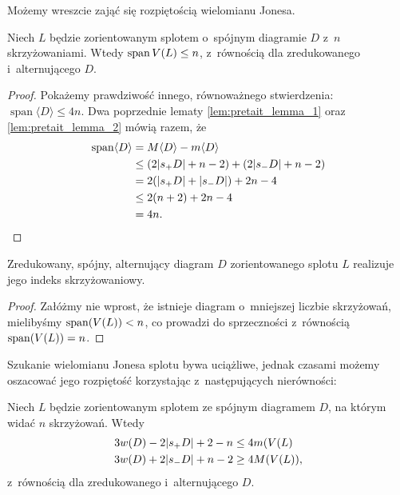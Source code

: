 Możemy wreszcie zająć się rozpiętością wielomianu Jonesa.

\begin{proposition}
    Niech $L$ będzie zorientowanym splotem o~spójnym diagramie $D$ z~$n$ skrzyżowaniami.
    Wtedy $\operatorname{span} V(L) \le n$, z~równością dla zredukowanego i~alternującego $D$.
\end{proposition}

\begin{proof}
    Pokażemy prawdziwość innego, równoważnego stwierdzenia: $\operatorname{span} \langle D\rangle\le 4n$.
    Dwa poprzednie lematy \ref{lem:pretait_lemma_1} oraz \ref{lem:pretait_lemma_2} mówią razem, że
    \begin{align}
        \operatorname{span}\langle D\rangle
        & = M\langle D\rangle - m\langle D\rangle \\
        & \le (2|s_+D|+n-2)+(2|s_-D|+n-2) \\
        & = 2(|s_+D|+|s_- D|)+2n-4 \\
        & \le 2(n+2)+2n-4 \\
        & = 4n. \qedhere
    \end{align}
\end{proof}

\begin{conjecture}
%
    Zredukowany, spójny, alternujący diagram $D$ zorientowanego splotu $L$ realizuje jego indeks skrzyżowaniowy.
\end{conjecture}

\begin{proof}
    Załóżmy nie wprost, że istnieje diagram o~mniejszej liczbie skrzyżowań,
    mielibyśmy $\operatorname{span} (V(L)) < n$, co prowadzi do sprzeczności z~równością $\operatorname{span} (V(L)) = n$.
\end{proof}

Szukanie wielomianu Jonesa splotu bywa uciążliwe,
jednak czasami możemy oszacować jego rozpiętość korzystając z~następujących nierówności:

\begin{corollary}
    Niech $L$ będzie zorientowanym splotem ze spójnym diagramem $D$, na którym widać $n$ skrzyżowań.
    Wtedy
    \begin{align}
        3w(D) - 2|s_+D| + 2 - n & \le 4 m(V(L) \\
        3w(D) + 2|s_-D| + n - 2 & \ge 4 M(V(L)),
    \end{align}
    z~równością dla zredukowanego i~alternującego $D$.
\end{corollary}

